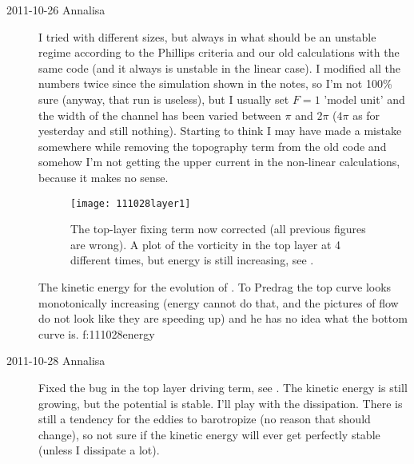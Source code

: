 \begin{description}
\item[2011-10-26 Annalisa]
I tried with different sizes, but always in what should be an unstable
regime according to the Phillips criteria and our old calculations with
the same code (and it always is unstable in the linear case). I modified
all the numbers twice since the simulation shown in the notes, so I'm not
100\% sure (anyway, that run is useless), but I usually set $F= 1$ 'model
unit'  and the width of the channel has been varied between $\pi$ and
$2\pi$  ($4\pi$  as for yesterday and still nothing). Starting to think I
may have made a mistake somewhere while removing the topography term from
the old code and somehow I'm not getting the upper current in the
non-linear calculations, because it makes no sense.

\begin{figure}%
\begin{center}
    \texttt{[image: 111028layer1]}
\end{center}
\caption{
The top-layer fixing term now corrected (all previous figures are wrong).
A plot of the vorticity in the top layer at 4 different times, but energy
is still increasing, see .
        }
\label{f:111028layer1}
\end{figure}

{}{
The kinetic energy for the evolution of . To
Predrag the top curve looks monotonically increasing (energy cannot do
that, and the pictures of flow do not look like they are speeding up) and
he has no idea what the bottom curve is.
}{f:111028energy}

\item[2011-10-28 Annalisa]
Fixed the bug in the top layer driving term, see .
The kinetic energy  is still growing, but the
potential is stable. I'll play with the dissipation. There is still a
tendency for the eddies to barotropize (no reason that should change), so
not sure if the kinetic energy will ever get perfectly stable (unless I
dissipate a lot).


\end{description}
